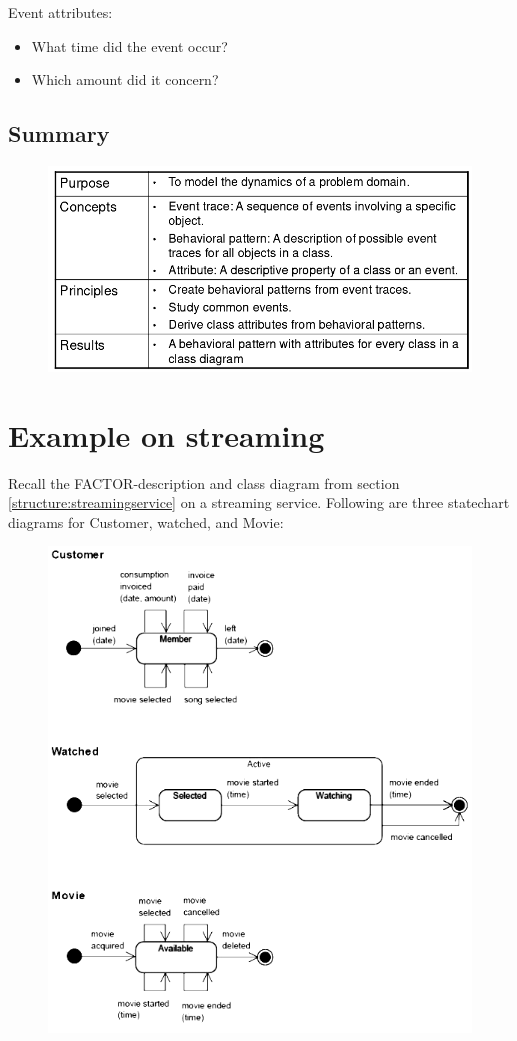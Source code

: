 \noindent Event attributes:
\begin{itemize}
    \item What time did the event occur?
    \item Which amount did it concern?
\end{itemize}


\subsection{Summary}
\begin{figure}[H]
    \centering
    \includegraphics[width=.7\textwidth]{figures/behavioursummary.png}
\end{figure}

\section{Example on streaming}\label{behaviour:streamingservice}
Recall the FACTOR-description and class diagram from section \ref{structure:streamingservice} on a streaming service. Following are three statechart diagrams for Customer, watched, and Movie:

\begin{figure}[H]
    \centering
    \includegraphics[width=.6\textwidth]{figures/statechartstreaming.png}
\end{figure}

